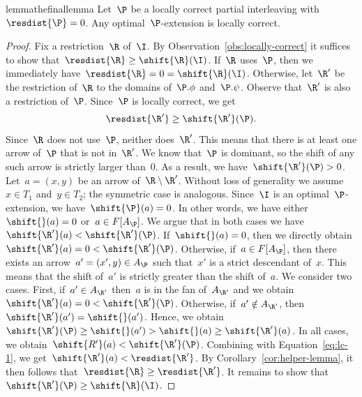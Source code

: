 %
\begin{restatable}{lemma}{thefinallemma}
\label{lem:optimal-extension-locally-correct}
    Let~$\P$ be a locally correct partial interleaving with~$\resdist{\P} = 0$.
    Any optimal~$\P$-extension is locally correct.
\end{restatable}
\begin{proof}
    Fix a restriction~$\R$ of~$\I$.
    By Observation~\ref{obs:locally-correct} it suffices to show that~$\resdist{\R} \ge \shift{\R}(\I)$.
    If~$\R$ uses~$\P$, then we immediately have~$\resdist{\R} = 0 = \shift{\R}(\I)$.
    Otherwise, let~$\R'$ be the restriction of~$\R$ to the domains of~$\P.\phi$ and~$\P.\psi$.
    Observe that~$\R'$ is also a restriction of~$\P$.
    Since~$\P$ is locally correct, we get
    \begin{equation}\label{eq:lc-1}
    \resdist{\R'} \ge \shift{\R'}(\P).
    \end{equation}
%
    Since~$\R$ does not use~$\P$, neither does~$\R'$.
    This means that there is at least one arrow of~$\P$ that is not in~$\R'$.
    We know that~$\P$ is dominant, so the shift of any such arrow is strictly larger than~$0$.
    As a result, we have~$\shift{\R'}(\P) > 0$.
%
    Let~$a = (x, y)$ be an arrow of~$\R \setminus \R'$.
    Without loss of generality we assume~$x \in T_1$ and~$y \in T_2$; the symmetric case is analogous.
    Since~$\I$ is an optimal~$\P$-extension, we have~$\shift{\P}(a) = 0$.
    In other words, we have either~$\shift{}(a) = 0$ or~$a \in F[A_\P]$.
    We argue that in both cases we have~$\shift{\R'}(a) < \shift{\R'}(\P)$.
    If~$\shift{}(a) = 0$, then we directly obtain~$\shift{\R'}(a) = 0 < \shift{\R'}(\P)$.
    Otherwise, if~$a \in F[A_\P]$, then there exists an arrow~$a' = (x', y) \in A_\P$ such that~$x'$ is a strict descendant of~$x$.
    This means that the shift of~$a'$ is strictly greater than the shift of~$a$.
    We consider two cases.
    First, if~$a' \in A_{\R'}$ then~$a$ is in the fan of~$A_{\R'}$ and we obtain~$\shift{\R'}(a) = 0 < \shift{\R'}(\P)$.
    Otherwise, if~$a' \notin A_{\R'}$, then~$\shift{\R'}(a') = \shift{}(a')$.
    Hence, we obtain~$\shift{\R'}(\P) \ge \shift{}(a') > \shift{}(a) \ge \shift{\R'}(a)$.
    In all cases, we obtain~$\shift{R'}(a) < \shift{\R'}(\P)$.
    Combining with Equation~\eqref{eq:lc-1}, we get~$\shift{\R'}(a) < \resdist{\R'}$.
    By Corollary~\ref{cor:helper-lemma}, it then follows that~$\resdist{\R} \ge \resdist{\R'}$.
%
    It remains to show that~$\shift{\R'}(\P) \ge \shift{\R}(\I)$.

\end{proof}
